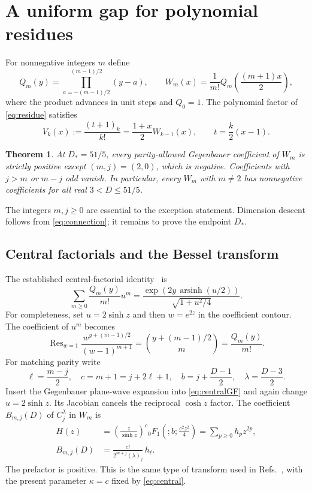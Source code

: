 \documentclass[11pt,a4paper]{article}
\newtheorem{theorem}{Theorem}[section]
\theoremstyle{remark}\newtheorem{remark}[theorem]{Remark}
\newcommand{\Res}{\operatorname{Res}}
\begin{document}
\section{A uniform gap for polynomial residues}\label{sec:gap}
For nonnegative integers $m$ define
\begin{equation}\label{eq:central}
 Q_m(y)=\prod_{a=-(m-1)/2}^{(m-1)/2}(y-a),\qquad
 W_m(x)=\frac1{m!}Q_m\!\left(\frac{(m+1)x}{2}\right),
\end{equation}
where the product advances in unit steps and $Q_0=1$. The polynomial factor of \eqref{eq:residue} satisfies
\begin{equation}\label{eq:VW}
 V_k(x):=\frac{(t+1)_k}{k!}
 =\frac{1+x}{2}W_{k-1}(x),\qquad t=\frac{k}{2}(x-1).
\end{equation}

\begin{theorem}\label{thm:gap}
At $D_*=51/5$, every parity-allowed Gegenbauer coefficient of $W_m$ is strictly positive except $(m,j)=(2,0)$, which is negative. Coefficients with $j>m$ or $m-j$ odd vanish. In particular, every $W_m$ with $m\neq2$ has nonnegative coefficients for all real $3<D\leq51/5$.
\end{theorem}
The integers $m,j\geq0$ are essential to the exception statement. Dimension descent follows from \eqref{eq:connection}; it remains to prove the endpoint $D_*$.

\subsection{Central factorials and the Bessel transform}
The established central-factorial identity~\cite{Chen} is
\begin{equation}\label{eq:centralGF}
 \sum_{m\geq0}\frac{Q_m(y)}{m!}u^m
 =\frac{\exp(2y\,\operatorname{arsinh}(u/2))}{\sqrt{1+u^2/4}}.
\end{equation}
For completeness, set $u=2\sinh z$ and then $w=e^{2z}$ in the coefficient contour. The coefficient of $u^m$ becomes
\begin{equation}
 \Res_{w=1}\frac{w^{y+(m-1)/2}}{(w-1)^{m+1}}
 =\binom{y+(m-1)/2}{m}=\frac{Q_m(y)}{m!}.
\end{equation}
For matching parity write
\begin{equation}\label{eq:Besselparams}
 \ell=\frac{m-j}{2},\quad c=m+1=j+2\ell+1,\quad
 b=j+\frac{D-1}{2},\quad \lambda=\frac{D-3}{2}.
\end{equation}
Insert the Gegenbauer plane-wave expansion into \eqref{eq:centralGF} and again change $u=2\sinh z$. Its Jacobian cancels the reciprocal $\cosh z$ factor. The coefficient $B_{m,j}(D)$ of $C_j^\lambda$ in $W_m$ is
\begin{align}\label{eq:BesselH}
 H(z)&=\left(\frac{z}{\sinh z}\right)^c
 {}_0F_1\!\left(;b;\frac{c^2z^2}{4}\right)
 =\sum_{p\geq0}h_pz^{2p},\\
 B_{m,j}(D)&=\frac{c^j}{2^{m+j}(\lambda)_j}\,h_\ell.\label{eq:prefactor}
\end{align}
The prefactor is positive. This is the same type of transform used in Refs.~\cite{AHHM,Chen}, with the present parameter $\kappa=c$ fixed by \eqref{eq:central}.
\end{document}

